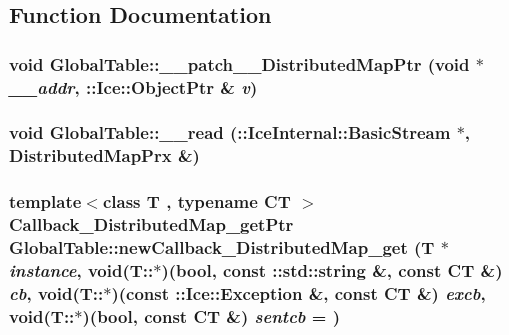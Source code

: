 \subsection{Function Documentation}
\hypertarget{namespace_global_table_af8ed819b515f76203cd95d96251105b4}{
\subsubsection[{\_\-\_\-patch\_\-\_\-DistributedMapPtr}]{\setlength{\rightskip}{0pt plus 5cm}void GlobalTable::\_\-\_\-patch\_\-\_\-DistributedMapPtr (void $\ast$ {\em \_\-\_\-addr}, \/  ::Ice::ObjectPtr \& {\em v})}}
\label{namespace_global_table_af8ed819b515f76203cd95d96251105b4}
\hypertarget{namespace_global_table_a1dbaa907b713de7f674f98535b23fc7d}{
\subsubsection[{\_\-\_\-read}]{\setlength{\rightskip}{0pt plus 5cm}void GlobalTable::\_\-\_\-read (::IceInternal::BasicStream $\ast$, \/  DistributedMapPrx \&)}}
\label{namespace_global_table_a1dbaa907b713de7f674f98535b23fc7d}
\hypertarget{namespace_global_table_a51bdc11c35c9aa3aaa7a8fefb6d7f582}{
\subsubsection[{newCallback\_\-DistributedMap\_\-get}]{\setlength{\rightskip}{0pt plus 5cm}template$<$class T , typename CT $>$ {\bf Callback\_\-DistributedMap\_\-getPtr} GlobalTable::newCallback\_\-DistributedMap\_\-get (T $\ast$ {\em instance}, \/  void(T::$\ast$)(bool, const ::std::string \&, const CT \&) {\em cb}, \/  void(T::$\ast$)(const ::Ice::Exception \&, const CT \&) {\em excb}, \/  void(T::$\ast$)(bool, const CT \&) {\em sentcb} = {})}}
\label{namespace_global_table_a51bdc11c35c9aa3aaa7a8fefb6d7f582}
